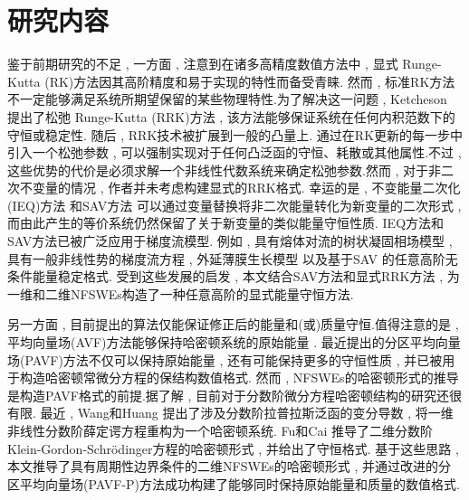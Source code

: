 \section{研究内容}
鉴于前期研究的不足 , 
一方面 , 注意到在诸多高精度数值方法中 , 显式 Runge-Kutta (RK)方法因其高阶精度和易于实现的特性而备受青睐.
然而 , 标准RK方法不一定能够满足系统所期望保留的某些物理特性.为了解决这一问题 , Ketcheson \cite{ketchesonRelaxationRungeKutta2019} 提出了松弛 Runge-Kutta (RRK)方法 , 该方法能够保证系统在任何内积范数下的守恒或稳定性.
随后 , RRK技术被扩展到一般的凸量上\cite{ranochaRelaxationRungeKutta2020}.
通过在RK更新的每一步中引入一个松弛参数 , 可以强制实现对于任何凸泛函的守恒、耗散或其他属性.不过 , 这些优势的代价是必须求解一个非线性代数系统来确定松弛参数.然而 , 对于非二次不变量的情况 , 作者并未考虑构建显式的RRK格式.
幸运的是 , 不变能量二次化(IEQ)方法 \cite{yangLinearUnconditionallyEnergy2017,yangEfficientLinearSchemes2017} 和SAV方法 \cite{chengConvergenceEnergyconservingScheme2022} 可以通过变量替换将非二次能量转化为新变量的二次形式 , 而由此产生的等价系统仍然保留了关于新变量的类似能量守恒性质.
IEQ方法和SAV方法已被广泛应用于梯度流模型\cite{zhaoNumericalApproximationsPhase2017,shenScalarAuxiliaryVariable2018,liuExponentialScalarAuxiliary2020,chengMultipleScalarAuxiliary2018}.
例如 , 具有熔体对流的树状凝固相场模型\cite{chenEfficientNumericalScheme2019} , 具有一般非线性势的梯度流方程\cite{yangConvergenceAnalysisInvariant2020} , 外延薄膜生长模型\cite{chengHighlyEfficientAccurate2019}
以及基于SAV 的任意高阶无条件能量稳定格式\cite{gongArbitrarilyHighorderUnconditionally2020}.
受到这些发展的启发 , 本文结合SAV方法和显式RRK方法 , 为一维和二维NFSWEs构造了一种任意高阶的显式能量守恒方法.

另一方面 , 目前提出的算法仅能保证修正后的能量和(或)质量守恒.值得注意的是 , 平均向量场(AVF)方法\cite{buddGeometricIntegrationUsing1999,quispelNewClassEnergypreserving2008}能够保持哈密顿系统的原始能量 . 
最近提出的分区平均向量场(PAVF)方法\cite{caiPartitionedAveragedVector2018}不仅可以保持原始能量 , 还有可能保持更多的守恒性质 , 并已被用于构造哈密顿常微分方程的保结构数值格式.
然而 , NFSWEs的哈密顿形式的推导是构造PAVF格式的前提.据了解 , 目前对于分数阶微分方程哈密顿结构的研究还很有限.
最近 , Wang和Huang \cite{wangStructurepreservingNumericalMethods2018} 提出了涉及分数阶拉普拉斯泛函的变分导数 , 将一维非线性分数阶薛定谔方程重构为一个哈密顿系统.
Fu和Cai \cite{fuStructurepreservingAlgorithmsTwodimensional2020} 推导了二维分数阶Klein-Gordon-Schr{\"o}dinger方程的哈密顿形式 , 并给出了守恒格式.
基于这些思路 , 本文推导了具有周期性边界条件的二维NFSWEs的哈密顿形式 , 并通过改进的分区平均向量场(PAVF-P)方法成功构建了能够同时保持原始能量和质量的数值格式.

